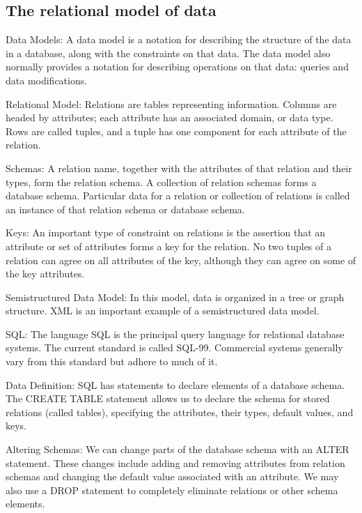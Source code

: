 \documentclass[11pt,oneside,a4paper]{article}
\begin{document}
\subsection{The relational model of data}

\begin{compactitem}
	\item Data Models: A data model is a notation for describing the structure of the data in a database, along with the constraints on that data. The data	model also normally provides a notation for describing operations on that data: queries and data modifications.
	\item Relational Model: Relations are tables representing information. Columns are headed by attributes; each attribute has an associated domain, or	data type. Rows are called tuples, and a tuple has one component for each attribute of the relation.
	\item Schemas: A relation name, together with the attributes of that relation and their types, form the relation schema. A collection of relation schemas forms a database schema. Particular data for a relation or collection of relations is called an instance of that relation schema or database schema.
	\item Keys: An important type of constraint on relations is the assertion that an attribute or set of attributes forms a key for the relation. No two tuples of a relation can agree on all attributes of the key, although they can agree on some of the key attributes.
	\item Semistructured Data Model: In this model, data is organized in a tree or graph structure. XML is an important example of a semistructured data model.
	\item SQL: The language SQL is the principal query language for relational database systems. The current standard is called SQL-99. Commercial systems generally vary from this standard but adhere to much of it.
	\item Data Definition: SQL has statements to declare elements of a database schema. The CREATE TABLE statement allows us to declare the schema for stored relations (called tables), specifying the attributes, their types, default values, and keys.
	\item Altering Schemas: We can change parts of the database schema with an ALTER statement. These changes include adding and removing attributes from relation schemas and changing the default value associated with an attribute. We may also use a DROP statement to completely eliminate relations or other schema elements.

\end{compactitem}
\end{document}

